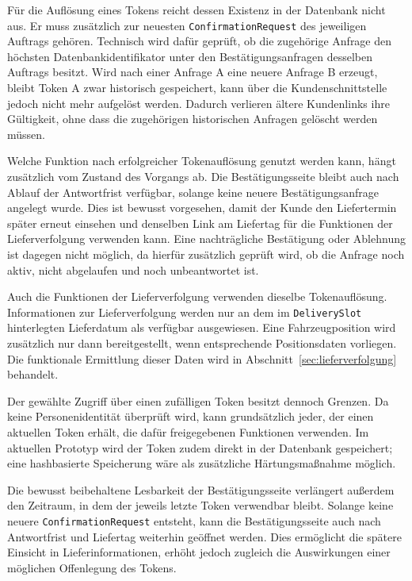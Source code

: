 \documentclass[
  12pt,
  a4paper,
  oneside
]{article}
\begin{document}
Für die Auflösung eines Tokens reicht dessen Existenz in der Datenbank nicht
aus. Er muss zusätzlich zur neuesten \texttt{ConfirmationRequest} des
jeweiligen Auftrags gehören. Technisch wird dafür geprüft, ob die zugehörige
Anfrage den höchsten Datenbankidentifikator unter den Bestätigungsanfragen
desselben Auftrags besitzt. Wird nach einer Anfrage A eine neuere Anfrage B
erzeugt, bleibt Token A zwar historisch gespeichert, kann über die
Kundenschnittstelle jedoch nicht mehr aufgelöst werden. Dadurch verlieren
ältere Kundenlinks ihre Gültigkeit, ohne dass die zugehörigen historischen
Anfragen gelöscht werden müssen.

Welche Funktion nach erfolgreicher Tokenauflösung genutzt werden kann, hängt
zusätzlich vom Zustand des Vorgangs ab. Die Bestätigungsseite bleibt auch
nach Ablauf der Antwortfrist verfügbar, solange keine neuere
Bestätigungsanfrage angelegt wurde. Dies ist bewusst vorgesehen, damit der
Kunde den Liefertermin später erneut einsehen und denselben Link am Liefertag
für die Funktionen der Lieferverfolgung verwenden kann. Eine nachträgliche
Bestätigung oder Ablehnung ist dagegen nicht möglich, da hierfür zusätzlich
geprüft wird, ob die Anfrage noch aktiv, nicht abgelaufen und noch unbeantwortet
ist.

Auch die Funktionen der Lieferverfolgung verwenden dieselbe Tokenauflösung.
Informationen zur Lieferverfolgung werden nur an dem im
\texttt{DeliverySlot} hinterlegten Lieferdatum als verfügbar ausgewiesen. Eine
Fahrzeugposition wird zusätzlich nur dann bereitgestellt, wenn entsprechende
Positionsdaten vorliegen. Die funktionale Ermittlung dieser Daten wird in
Abschnitt~\ref{sec:lieferverfolgung} behandelt.

Der gewählte Zugriff über einen zufälligen Token besitzt dennoch Grenzen. Da
keine Personenidentität überprüft wird, kann grundsätzlich jeder, der einen
aktuellen Token erhält, die dafür freigegebenen Funktionen verwenden. Im
aktuellen Prototyp wird der Token zudem direkt in der Datenbank gespeichert;
eine hashbasierte Speicherung wäre als zusätzliche Härtungsmaßnahme möglich.

Die bewusst beibehaltene Lesbarkeit der Bestätigungsseite verlängert
außerdem den Zeitraum, in dem der jeweils letzte Token verwendbar bleibt.
Solange keine neuere \texttt{ConfirmationRequest} entsteht, kann die
Bestätigungsseite auch nach Antwortfrist und Liefertag weiterhin geöffnet
werden. Dies ermöglicht die spätere Einsicht in Lieferinformationen, erhöht
jedoch zugleich die Auswirkungen einer möglichen Offenlegung des Tokens.
\end{document}
